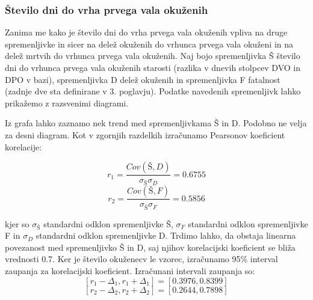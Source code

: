 \documentclass[a4paper,11pt]{article}
\begin{document}
\subsubsection{Število dni do vrha prvega vala okuženih}

Zanima me kako je število dni do vrha prvega vala okuženih vpliva na druge spremenljivke in sicer na delež okuženih do vrhunca prvega vala okuženi in na delež mrtvih do vrhunca prvega vala okuženih. Naj bojo spremenljivka Š število dni do vrhunca prvega vala okuženih starosti (razlika v dnevih stolpcev DVO in DPO v bazi), spremenljivka D delež okuženih in spremenljivka F fatalnost (zadnje dve sta definirane v 3. poglavju). Podatke navedenih spremenljivk lahko prikažemo z razsvenimi diagrami.

\begin{figure}
    \centering
\end{figure}
Iz grafa lahko zaznamo nek trend med spremenljivkama Š in D. Podobno ne velja za desni diagram. Kot v zgornjih razdelkih izračunamo Pearsonov koeficient korelacije:

\[r_1 = \frac{Cov(Š,D)}{\sigma_{Š} \sigma_{D}} = 0.6755\]
\[r_2 = \frac{Cov(Š,F)}{\sigma_{Š} \sigma_{F}} = 0.5856\]

kjer so \(\sigma_{Š}\) standardni odklon spremenljivke Š, \(\sigma_{F}\) standardni odklon spremenljivke F in \(\sigma_{D}\) standardni odklon spremenljivke D. Trdimo lahko, da obstaja linearna povezanost med spremenljivko Š in D, saj njihov korelacijski koeficient se bliža vrednosti 0.7. 
Ker je število okuženecv le vzorec, izračunamo 95\% interval zaupanja za korelacijski koeficient. Izračunani intervali zaupanja so:
\[[r_1 - \Delta_1, r_1 + \Delta_1] = [0.3976, 0.8399]\]
\[[r_2 - \Delta_2, r_2 + \Delta_2] = [0.2644, 0.7898]\]
\end{document}
